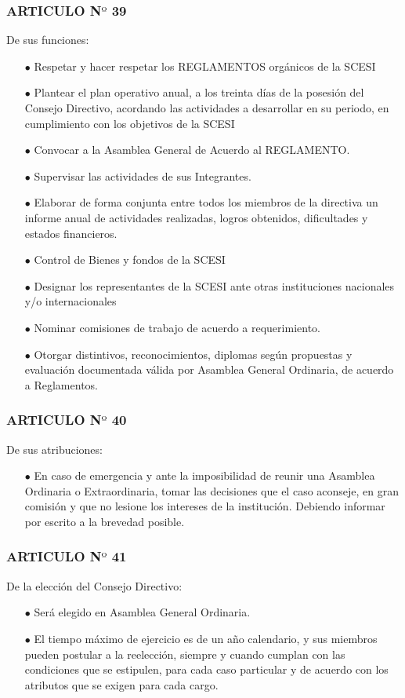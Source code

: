 \documentclass[11pt,letterpaper]{book}
\begin{document}
\begin{itemize}
\subsubsection*{ARTICULO N$º$ 39}
De sus funciones:
\begin{itemize}
\item[$\bullet$] Respetar y hacer respetar los REGLAMENTOS orgánicos de la SCESI 
\item[$\bullet$] Plantear el plan operativo anual, a los treinta días de la posesión del Consejo Directivo, acordando las actividades a desarrollar en su periodo, en cumplimiento con los objetivos de la SCESI 
\item[$\bullet$] Convocar a la Asamblea General de Acuerdo al REGLAMENTO.  
\item[$\bullet$] Supervisar las actividades de sus Integrantes. 
\item[$\bullet$] Elaborar de forma conjunta entre todos los  miembros de la directiva un informe anual de  actividades  realizadas, logros  obtenidos, dificultades  y estados  financieros. 
\item[$\bullet$] Control de Bienes  y fondos  de  la SCESI 
\item[$\bullet$] Designar  los  representantes  de la SCESI ante otras instituciones  nacionales  y/o internacionales   
\item[$\bullet$]  Nominar comisiones  de trabajo de acuerdo a requerimiento. 
\item[$\bullet$] Otorgar distintivos, reconocimientos, diplomas según  propuestas  y evaluación  documentada válida por  Asamblea  General Ordinaria, de acuerdo a Reglamentos. 
\end{itemize}
\subsubsection*{ARTICULO N$º$ 40}
De sus  atribuciones:
 \begin{itemize}
\item[$\bullet$] En caso de emergencia y ante la imposibilidad de reunir una Asamblea Ordinaria o Extraordinaria, tomar las decisiones que  el caso aconseje, en gran comisión y que no lesione los intereses de la  institución. Debiendo informar por escrito a la  brevedad posible. 
\end{itemize}
\subsubsection*{ARTICULO N$º$ 41}
De la  elección  del Consejo  Directivo:
\begin{itemize}
\item[$\bullet$] Será  elegido en  Asamblea  General  Ordinaria. 
\item[$\bullet$] El  tiempo máximo de ejercicio es de un año calendario, y  sus  miembros  pueden  postular a la  reelección,  siempre y cuando cumplan  con  las  condiciones  que  se estipulen,  para cada  caso particular  y  de  acuerdo con los  atributos que se exigen  para cada cargo.    
\end{itemize}
\end{itemize}
\newpage
\end{document}

